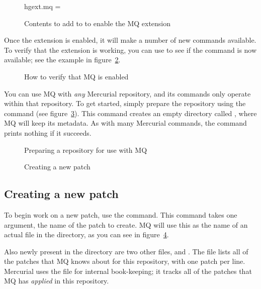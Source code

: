\begin{figure}[ht]
  \begin{codesample4}
    [extensions]
    hgext.mq =
  \end{codesample4}
  \label{ex:mq:config}
  \caption{Contents to add to  to enable the MQ extension}
\end{figure}

Once the extension is enabled, it will make a number of new commands
available.  To verify that the extension is working, you can use
 to see if the  command is now available; see
the example in figure~\ref{ex:mq:enabled}.

\begin{figure}[ht]
  \caption{How to verify that MQ is enabled}
  \label{ex:mq:enabled}
\end{figure}

You can use MQ with \emph{any} Mercurial repository, and its commands
only operate within that repository.  To get started, simply prepare
the repository using the  command (see
figure~\ref{ex:mq:qinit}).  This command creates an empty directory
called , where MQ will keep its metadata.  As
with many Mercurial commands, the  command prints nothing
if it succeeds.

\begin{figure}[ht]
  \caption{Preparing a repository for use with MQ}
  \label{ex:mq:qinit}
\end{figure}

\begin{figure}[ht]
  \caption{Creating a new patch}
  \label{ex:mq:qnew}
\end{figure}

\subsection{Creating a new patch}

To begin work on a new patch, use the  command.  This
command takes one argument, the name of the patch to create.  MQ will
use this as the name of an actual file in the 
directory, as you can see in figure~\ref{ex:mq:qnew}.

Also newly present in the  directory are two
other files,  and .  The
 file lists all of the patches that MQ knows about
for this repository, with one patch per line.  Mercurial uses the
 file for internal book-keeping; it tracks all of the
patches that MQ has \emph{applied} in this repository.

